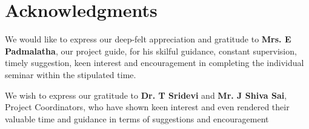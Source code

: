 \cleardoublepage
{}
{}
\chapter*{Acknowledgments}
\vspace{1.0in}
We would like to express our deep-felt appreciation and gratitude to \textbf{Mrs. E Padmalatha}, our project guide, for his skilful guidance, constant supervision, timely suggestion, keen interest and encouragement in completing the individual seminar within the stipulated time.
\par
We wish to express our gratitude to \textbf{Dr. T Sridevi} and \textbf{Mr. J Shiva Sai}, Project Coordinators, who have shown keen interest and even rendered their valuable time and guidance in terms of suggestions and encouragement
\newpage
